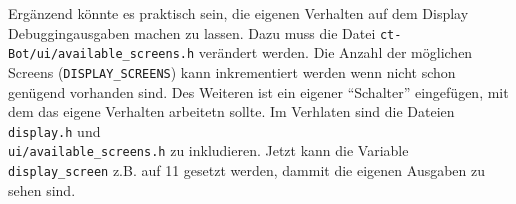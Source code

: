 Ergänzend könnte es praktisch sein, die eigenen Verhalten auf dem Display
Debuggingausgaben machen zu lassen. Dazu muss die Datei
\verb+ct-Bot/ui/available_screens.h+ verändert werden. Die Anzahl
der möglichen Screens (\verb+DISPLAY_SCREENS+) kann inkrementiert werden
wenn nicht schon genügend vorhanden sind. Des Weiteren ist ein eigener
"`Schalter"' eingefügen, mit dem das eigene Verhalten arbeitetn sollte.
Im Verhlaten sind die Dateien \verb+display.h+ und \\
\verb+ui/available_screens.h+ zu inkludieren. Jetzt kann die Variable
\verb+display_screen+ z.B. auf 11 gesetzt werden, dammit die eigenen
Ausgaben zu sehen sind. \\
